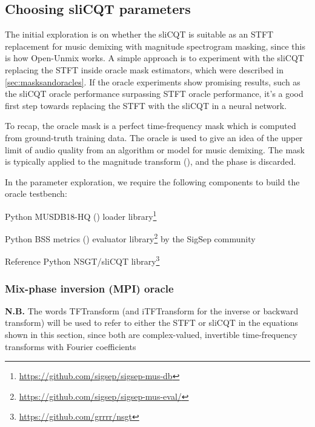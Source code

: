 \documentclass[report.tex]{subfiles}
\begin{document}
\newpagefill

\subsection{Choosing sliCQT parameters}
\label{sec:slicqparamsrch}

The initial exploration is on whether the sliCQT is suitable as an STFT replacement for music demixing with magnitude spectrogram masking, since this is how Open-Unmix works. A simple approach is to experiment with the sliCQT replacing the STFT inside oracle mask estimators, which were described in \ref{sec:masksandoracles}. If the oracle experiments show promising results, such as the sliCQT oracle performance surpassing STFT oracle performance, it's a good first step towards replacing the STFT with the sliCQT in a neural network.

To recap, the oracle mask is a perfect time-frequency mask which is computed from ground-truth training data. The oracle is used to give an idea of the upper limit of audio quality from an algorithm or model for music demixing. The mask is typically applied to the magnitude transform (\cite{umx}), and the phase is discarded.

In the parameter exploration, we require the following components to build the oracle testbench:

\begin{tight_enumerate}
	\item
		Python MUSDB18-HQ (\cite{musdb18hq}) loader library\footnote{\url{https://github.com/sigsep/sigsep-mus-db}}
	\item
		Python BSS metrics (\cite{bss}) evaluator library\footnote{\url{https://github.com/sigsep/sigsep-mus-eval/}} by the SigSep community
	\item
		Reference Python NSGT/sliCQT library\footnote{\url{https://github.com/grrrr/nsgt}}
\end{tight_enumerate}

\subsubsection{Mix-phase inversion (MPI) oracle}
\label{sec:mpi}

\textbf{N.B.} The words TFTransform (and iTFTransform for the inverse or backward transform) will be used to refer to either the STFT or sliCQT in the equations shown in this section, since both are complex-valued, invertible time-frequency transforms with Fourier coefficients
\end{document}
